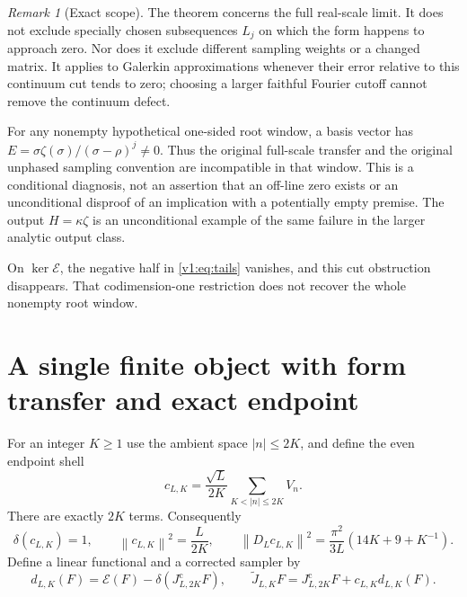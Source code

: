 \documentclass[11pt]{article}
\theoremstyle{remark}
\newtheorem{remark}[theorem]{Remark}
\newcommand{\norm}[1]{\left\lVert #1\right\rVert}
\newcommand{\Jc}{J^{\mathrm c}}
\newcommand{\Jr}{\widetilde J}
\newcommand{\E}{\mathscr E}
\begin{document}
\begin{remark}[Exact scope]
The theorem concerns the full real-scale limit. It does not exclude
specially chosen subsequences $L_j$ on which the form happens to approach
zero. Nor does it exclude different sampling weights or a changed
matrix. It applies to Galerkin approximations whenever their error relative
to this continuum cut tends to zero; choosing a larger faithful Fourier
cutoff cannot remove the continuum defect.

For any nonempty hypothetical one-sided root window, a basis vector has
$E=\sigma\zeta(\sigma)/(\sigma-\rho)^j\ne0$. Thus the original full-scale
transfer and the original unphased sampling convention are incompatible
in that window. This is a conditional diagnosis, not an assertion that an
off-line zero exists or an unconditional disproof of an implication with
a potentially empty premise. The output $H=\kappa\zeta$ is an unconditional
example of the same failure in the larger analytic output class.

On $\ker\E$, the negative half in \eqref{v1:eq:tails} vanishes, and this cut
obstruction disappears. That codimension-one restriction does not recover
the whole nonempty root window.
\end{remark}

\section{A single finite object with form transfer and exact endpoint}

For an integer $K\ge1$ use the ambient space $|n|\le2K$, and define the
even endpoint shell
\begin{equation}\label{v1:eq:shell}
 c_{L,K}=\frac{\sqrt L}{2K}\sum_{K<|n|\le2K}V_n.
\end{equation}
There are exactly $2K$ terms. Consequently
\begin{equation}\label{v1:eq:shellnorms}
 \delta(c_{L,K})=1,\qquad
 \norm{c_{L,K}}^2=\frac L{2K},\qquad
 \norm{D_Lc_{L,K}}^2=\frac{\pi^2}{3L}(14K+9+K^{-1}).
\end{equation}
Define a linear functional and a corrected sampler by
\begin{equation}\label{v1:eq:repair}
 d_{L,K}(F)=\E(F)-\delta(\Jc_{L,2K}F),\qquad
 \Jr_{L,K}F=\Jc_{L,2K}F+c_{L,K}d_{L,K}(F).
\end{equation}
\end{document}
